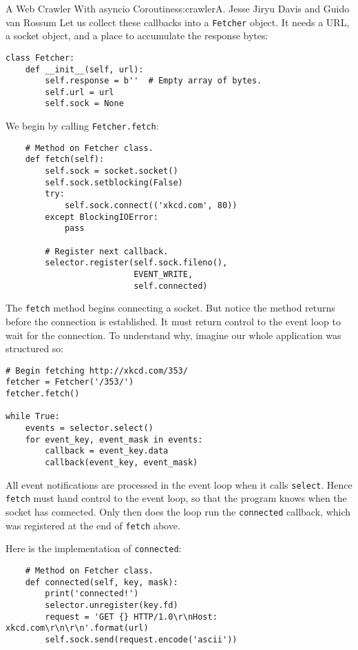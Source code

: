 \begin{aosachapter}{A Web Crawler With asyncio Coroutines}{s:crawler}{A. Jesse Jiryu Davis and Guido van Rossum}
Let us collect these callbacks into a \texttt{Fetcher} object. It needs
a URL, a socket object, and a place to accumulate the response bytes:

\begin{verbatim}
class Fetcher:
    def __init__(self, url):
        self.response = b''  # Empty array of bytes.
        self.url = url
        self.sock = None
\end{verbatim}

We begin by calling \texttt{Fetcher.fetch}:

\begin{verbatim}
    # Method on Fetcher class.
    def fetch(self):
        self.sock = socket.socket()
        self.sock.setblocking(False)
        try:
            self.sock.connect(('xkcd.com', 80))
        except BlockingIOError:
            pass
            
        # Register next callback.
        selector.register(self.sock.fileno(),
                          EVENT_WRITE,
                          self.connected)
\end{verbatim}

The \texttt{fetch} method begins connecting a socket. But notice the
method returns before the connection is established. It must return
control to the event loop to wait for the connection. To understand why,
imagine our whole application was structured so:

\begin{verbatim}
# Begin fetching http://xkcd.com/353/
fetcher = Fetcher('/353/')
fetcher.fetch()

while True:
    events = selector.select()
    for event_key, event_mask in events:
        callback = event_key.data
        callback(event_key, event_mask)
\end{verbatim}

All event notifications are processed in the event loop when it calls
\texttt{select}. Hence \texttt{fetch} must hand control to the event
loop, so that the program knows when the socket has connected. Only then
does the loop run the \texttt{connected} callback, which was registered
at the end of \texttt{fetch} above.

Here is the implementation of \texttt{connected}:

\begin{verbatim}
    # Method on Fetcher class.
    def connected(self, key, mask):
        print('connected!')
        selector.unregister(key.fd)
        request = 'GET {} HTTP/1.0\r\nHost: xkcd.com\r\n\r\n'.format(url)
        self.sock.send(request.encode('ascii'))
        

\end{verbatim}
\end{aosachapter}
